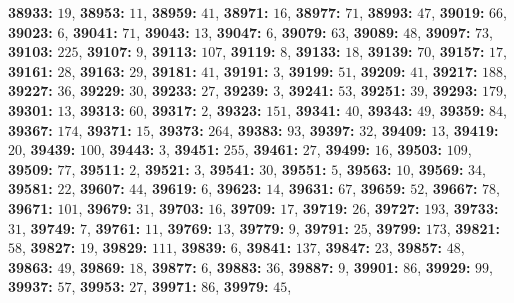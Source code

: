 \textsf{\bfseries 38933:} $19$, \textsf{\bfseries 38953:} $11$, \textsf{\bfseries 38959:} $41$, \textsf{\bfseries 38971:} $16$, \textsf{\bfseries 38977:} $71$, \textsf{\bfseries 38993:} $47$, \textsf{\bfseries 39019:} $66$, \textsf{\bfseries 39023:} $6$, \textsf{\bfseries 39041:} $71$, \textsf{\bfseries 39043:} $13$, \textsf{\bfseries 39047:} $6$, \textsf{\bfseries 39079:} $63$, \textsf{\bfseries 39089:} $48$, \textsf{\bfseries 39097:} $73$, \textsf{\bfseries 39103:} $225$, \textsf{\bfseries 39107:} $9$, \textsf{\bfseries 39113:} $107$, \textsf{\bfseries 39119:} $8$, \textsf{\bfseries 39133:} $18$, \textsf{\bfseries 39139:} $70$, \textsf{\bfseries 39157:} $17$, \textsf{\bfseries 39161:} $28$, \textsf{\bfseries 39163:} $29$, \textsf{\bfseries 39181:} $41$, \textsf{\bfseries 39191:} $3$, \textsf{\bfseries 39199:} $51$, \textsf{\bfseries 39209:} $41$, \textsf{\bfseries 39217:} $188$, \textsf{\bfseries 39227:} $36$, \textsf{\bfseries 39229:} $30$, \textsf{\bfseries 39233:} $27$, \textsf{\bfseries 39239:} $3$, \textsf{\bfseries 39241:} $53$, \textsf{\bfseries 39251:} $39$, \textsf{\bfseries 39293:} $179$, \textsf{\bfseries 39301:} $13$, \textsf{\bfseries 39313:} $60$, \textsf{\bfseries 39317:} $2$, \textsf{\bfseries 39323:} $151$, \textsf{\bfseries 39341:} $40$, \textsf{\bfseries 39343:} $49$, \textsf{\bfseries 39359:} $84$, \textsf{\bfseries 39367:} $174$, \textsf{\bfseries 39371:} $15$, \textsf{\bfseries 39373:} $264$, \textsf{\bfseries 39383:} $93$, \textsf{\bfseries 39397:} $32$, \textsf{\bfseries 39409:} $13$, \textsf{\bfseries 39419:} $20$, \textsf{\bfseries 39439:} $100$, \textsf{\bfseries 39443:} $3$, \textsf{\bfseries 39451:} $255$, \textsf{\bfseries 39461:} $27$, \textsf{\bfseries 39499:} $16$, \textsf{\bfseries 39503:} $109$, \textsf{\bfseries 39509:} $77$, \textsf{\bfseries 39511:} $2$, \textsf{\bfseries 39521:} $3$, \textsf{\bfseries 39541:} $30$, \textsf{\bfseries 39551:} $5$, \textsf{\bfseries 39563:} $10$, \textsf{\bfseries 39569:} $34$, \textsf{\bfseries 39581:} $22$, \textsf{\bfseries 39607:} $44$, \textsf{\bfseries 39619:} $6$, \textsf{\bfseries 39623:} $14$, \textsf{\bfseries 39631:} $67$, \textsf{\bfseries 39659:} $52$, \textsf{\bfseries 39667:} $78$, \textsf{\bfseries 39671:} $101$, \textsf{\bfseries 39679:} $31$, \textsf{\bfseries 39703:} $16$, \textsf{\bfseries 39709:} $17$, \textsf{\bfseries 39719:} $26$, \textsf{\bfseries 39727:} $193$, \textsf{\bfseries 39733:} $31$, \textsf{\bfseries 39749:} $7$, \textsf{\bfseries 39761:} $11$, \textsf{\bfseries 39769:} $13$, \textsf{\bfseries 39779:} $9$, \textsf{\bfseries 39791:} $25$, \textsf{\bfseries 39799:} $173$, \textsf{\bfseries 39821:} $58$, \textsf{\bfseries 39827:} $19$, \textsf{\bfseries 39829:} $111$, \textsf{\bfseries 39839:} $6$, \textsf{\bfseries 39841:} $137$, \textsf{\bfseries 39847:} $23$, \textsf{\bfseries 39857:} $48$, \textsf{\bfseries 39863:} $49$, \textsf{\bfseries 39869:} $18$, \textsf{\bfseries 39877:} $6$, \textsf{\bfseries 39883:} $36$, \textsf{\bfseries 39887:} $9$, \textsf{\bfseries 39901:} $86$, \textsf{\bfseries 39929:} $99$, \textsf{\bfseries 39937:} $57$, \textsf{\bfseries 39953:} $27$, \textsf{\bfseries 39971:} $86$, \textsf{\bfseries 39979:} $45$, 

